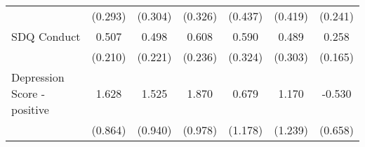 {\begin{tabular}{l*{6}{c}}
            &     (0.293)         &     (0.304)         &     (0.326)         &     (0.437)         &     (0.419)         &     (0.241)         \\
\addlinespace
SDQ Conduct &       0.507\sym{*}  &       0.498\sym{*}  &       0.608\sym{**} &       0.590         &       0.489         &       0.258         \\
            &     (0.210)         &     (0.221)         &     (0.236)         &     (0.324)         &     (0.303)         &     (0.165)         \\
\addlinespace
Depression Score - positive&       1.628         &       1.525         &       1.870         &       0.679         &       1.170         &      -0.530         \\
            &     (0.864)         &     (0.940)         &     (0.978)         &     (1.178)         &     (1.239)         &     (0.658)         \\
\bottomrule
\end{tabular}
}
